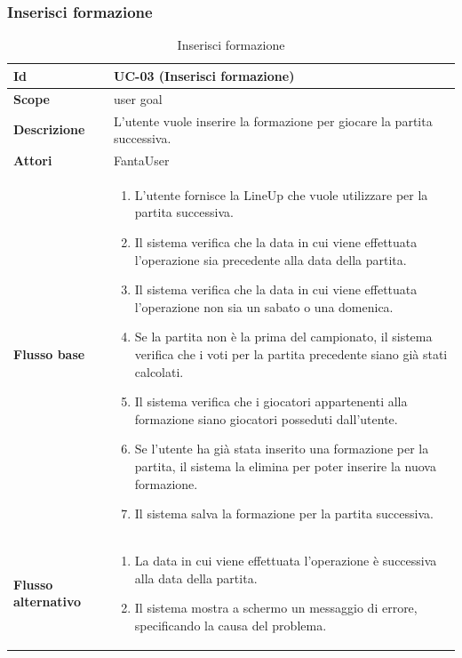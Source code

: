 \subsubsection{Inserisci formazione}
\begin{table}[H]
\caption{Inserisci formazione}
\label{UC-03}

\begin{tabularx}{\textwidth}{|l|X|}
\hline
\textbf{Id} & UC-03 (Inserisci formazione) \\
\hline
\textbf{Scope} & user goal \\
\hline
\textbf{Descrizione} & L'utente vuole inserire la formazione per giocare la partita successiva. \\
\hline
\textbf{Attori} & FantaUser \\
\hline
\textbf{Flusso base} &
\begin{enumerate}[leftmargin=*]
    \item L'utente fornisce la LineUp che vuole utilizzare per la partita successiva.
    \item Il sistema verifica che la data in cui viene effettuata l'operazione 
            sia precedente alla data della partita.
    \item Il sistema verifica che la data in cui viene effettuata l'operazione 
            non sia un sabato o una domenica.
    \item Se la partita non è la prima del campionato, il sistema verifica che 
            i voti per la partita precedente siano già stati calcolati. 
    \item Il sistema verifica che i giocatori appartenenti alla formazione 
            siano giocatori posseduti dall'utente.
    \item Se l'utente ha già stata inserito una formazione per la partita, 
            il sistema la elimina per poter inserire la nuova formazione.
    \item Il sistema salva la formazione per la partita successiva.
\end{enumerate} \\
\hline
\textbf{Flusso alternativo} &
\begin{enumerate}[leftmargin=*,label=2.\arabic*]
    \item La data in cui viene effettuata l'operazione è successiva alla data della partita.
    \item Il sistema mostra a schermo un messaggio di errore, specificando la causa del problema.
\end{enumerate}
\begin{enumerate}[leftmargin=*,label=3.\arabic*]

\end{enumerate}
\end{tabularx}
\end{table}
